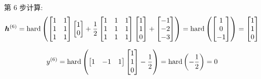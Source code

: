 \documentclass{article}
\begin{document}
第 6 步计算:
\begin{equation}
  \bm{h}^{(6)}
  =\operatorname{hard}\left(
    \begin{bmatrix}
      1 & 1 \\
      1 & 1 \\
      1 & 1 \\
    \end{bmatrix}
    \begin{bmatrix}
      1 \\ 0 \\
    \end{bmatrix}
    +\frac{1}{2}
    \begin{bmatrix}
      1 & 1 & 1 \\
      1 & 1 & 1 \\
      1 & 1 & 1 \\
    \end{bmatrix}
    \begin{bmatrix}
      1 \\ 1 \\ 0 \\
    \end{bmatrix}
    +
    \begin{bmatrix}
      -1 \\ -2 \\ -3 \\
    \end{bmatrix}
  \right)
  =\operatorname{hard}\left(
    \begin{bmatrix}
      1 \\ 0 \\ -1 \\
    \end{bmatrix}
  \right)
  =
  \begin{bmatrix}
    1 \\ 1 \\ 0 \\
  \end{bmatrix}
\end{equation}

\begin{equation}
  y^{(6)}
  =\operatorname{hard}\left(
    \begin{bmatrix}
      1 & -1 & 1 \\
    \end{bmatrix}
    \begin{bmatrix}
      1 \\ 1 \\ 0 \\
    \end{bmatrix}
    -\frac{1}{2}
  \right)
  =\operatorname{hard}\left(
    -\frac{1}{2}
  \right)
  =0
\end{equation}
\end{document}
